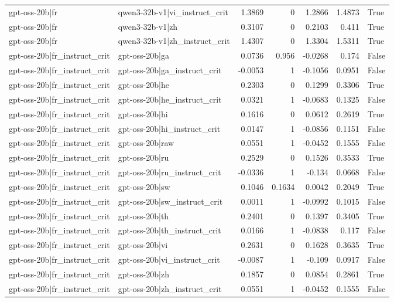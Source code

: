 \begin{table}
\begin{tabular}{l l r r r r l}
gpt-oss-20b|fr & qwen3-32b-v1|vi_instruct_crit & 1.3869 & 0 & 1.2866 & 1.4873 & True \\
gpt-oss-20b|fr & qwen3-32b-v1|zh & 0.3107 & 0 & 0.2103 & 0.411 & True \\
gpt-oss-20b|fr & qwen3-32b-v1|zh_instruct_crit & 1.4307 & 0 & 1.3304 & 1.5311 & True \\
gpt-oss-20b|fr_instruct_crit & gpt-oss-20b|ga & 0.0736 & 0.956 & -0.0268 & 0.174 & False \\
gpt-oss-20b|fr_instruct_crit & gpt-oss-20b|ga_instruct_crit & -0.0053 & 1 & -0.1056 & 0.0951 & False \\
gpt-oss-20b|fr_instruct_crit & gpt-oss-20b|he & 0.2303 & 0 & 0.1299 & 0.3306 & True \\
gpt-oss-20b|fr_instruct_crit & gpt-oss-20b|he_instruct_crit & 0.0321 & 1 & -0.0683 & 0.1325 & False \\
gpt-oss-20b|fr_instruct_crit & gpt-oss-20b|hi & 0.1616 & 0 & 0.0612 & 0.2619 & True \\
gpt-oss-20b|fr_instruct_crit & gpt-oss-20b|hi_instruct_crit & 0.0147 & 1 & -0.0856 & 0.1151 & False \\
gpt-oss-20b|fr_instruct_crit & gpt-oss-20b|raw & 0.0551 & 1 & -0.0452 & 0.1555 & False \\
gpt-oss-20b|fr_instruct_crit & gpt-oss-20b|ru & 0.2529 & 0 & 0.1526 & 0.3533 & True \\
gpt-oss-20b|fr_instruct_crit & gpt-oss-20b|ru_instruct_crit & -0.0336 & 1 & -0.134 & 0.0668 & False \\
gpt-oss-20b|fr_instruct_crit & gpt-oss-20b|sw & 0.1046 & 0.1634 & 0.0042 & 0.2049 & True \\
gpt-oss-20b|fr_instruct_crit & gpt-oss-20b|sw_instruct_crit & 0.0011 & 1 & -0.0992 & 0.1015 & False \\
gpt-oss-20b|fr_instruct_crit & gpt-oss-20b|th & 0.2401 & 0 & 0.1397 & 0.3405 & True \\
gpt-oss-20b|fr_instruct_crit & gpt-oss-20b|th_instruct_crit & 0.0166 & 1 & -0.0838 & 0.117 & False \\
gpt-oss-20b|fr_instruct_crit & gpt-oss-20b|vi & 0.2631 & 0 & 0.1628 & 0.3635 & True \\
gpt-oss-20b|fr_instruct_crit & gpt-oss-20b|vi_instruct_crit & -0.0087 & 1 & -0.109 & 0.0917 & False \\
gpt-oss-20b|fr_instruct_crit & gpt-oss-20b|zh & 0.1857 & 0 & 0.0854 & 0.2861 & True \\
gpt-oss-20b|fr_instruct_crit & gpt-oss-20b|zh_instruct_crit & 0.0551 & 1 & -0.0452 & 0.1555 & False \\

\end{tabular}
\end{table}
